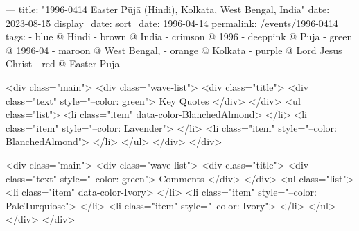---
title: "1996-0414 Easter Pūjā (Hindi), Kolkata, West Bengal, India"
date: 2023-08-15
display_date: 
sort_date: 1996-04-14
permalink: /events/1996-0414
tags:
  - blue @ Hindi
  - brown @ India
  - crimson @ 1996
  - deeppink @ Puja
  - green @ 1996-04
  - maroon @ West Bengal,
  - orange @ Kolkata
  - purple @ Lord Jesus Christ
  - red @ Easter Puja
---

<div class="main">
  <div class="wave-list">
    <div class="title">
      <div class="text" style="--color: green">
        Key Quotes
      </div>
    </div>
    <ul class="list">
        <li class="item" data-color-BlanchedAlmond>
        </li>
        <li class="item" style="--color: Lavender">
        </li>
        <li class="item" style="--color: BlanchedAlmond">
        </li>
      </ul>
  </div>
</div>

<div class="main">
  <div class="wave-list">
    <div class="title">
      <div class="text" style="--color: green">
        Comments
      </div>
    </div>
    <ul class="list">
        <li class="item" data-color-Ivory>
        </li>
        <li class="item" style="--color: PaleTurquiose">
        </li>
        <li class="item" style="--color: Ivory">
        </li>
      </ul>
  </div>
</div>